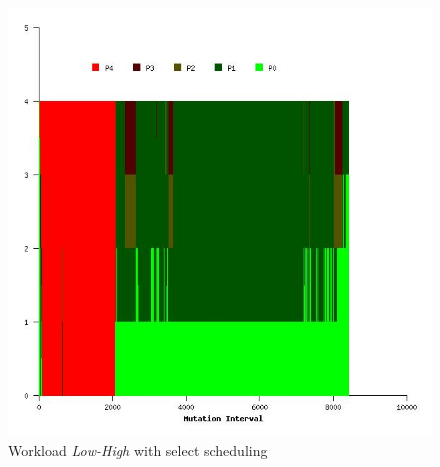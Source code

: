 \begin{figure}
  \begin{center}
    \includegraphics[scale=0.4]{figures/mutation_timeline_figures/mut_sel_t1/Low-High/125_4.jpeg}%
    \caption{Workload \textit{Low-High} with select scheduling}
    \label{fig:wrk_lowhigh_select}
  \end{center}
\end{figure}

